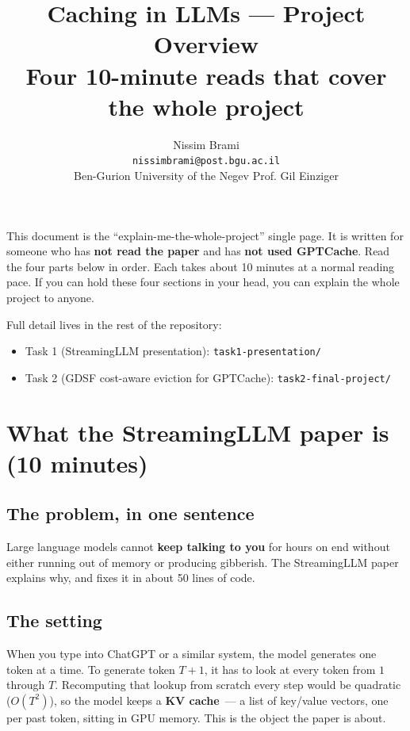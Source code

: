 \documentclass[11pt,a4paper]{article}
\title{
  \vspace{-1cm}
  {\color{navy}\Huge Caching in LLMs --- Project Overview}\\[0.3em]
  {\color{blue1}\Large Four 10-minute reads that cover the whole project}
}
\author{Nissim Brami \\[-0.2em]
  {\small \texttt{nissimbrami@post.bgu.ac.il}} \\[-0.2em]
  {\small Ben-Gurion University of the Negev \textbullet{} Prof. Gil Einziger}}
\date{}
\begin{document}
\maketitle
\thispagestyle{empty}

\noindent
This document is the ``explain-me-the-whole-project'' single page. It is
written for someone who has \textbf{not read the paper} and has \textbf{not
used GPTCache}. Read the four parts below in order. Each takes about 10
minutes at a normal reading pace. If you can hold these four sections in
your head, you can explain the whole project to anyone.

\medskip
Full detail lives in the rest of the repository:
\begin{itemize}[leftmargin=1.2em,itemsep=0.15em]
  \item Task 1 (StreamingLLM presentation): \texttt{task1-presentation/}
  \item Task 2 (GDSF cost-aware eviction for GPTCache): \texttt{task2-final-project/}
\end{itemize}

\section{What the StreamingLLM paper is (10 minutes)}

\subsection{The problem, in one sentence}
Large language models cannot \textbf{keep talking to you} for hours on end
without either running out of memory or producing gibberish. The
StreamingLLM paper explains why, and fixes it in about 50 lines of code.

\subsection{The setting}
When you type into ChatGPT or a similar system, the model generates one
token at a time. To generate token $T{+}1$, it has to look at every token
from $1$ through $T$. Recomputing that lookup from scratch every step would
be quadratic ($O(T^{2})$), so the model keeps a \textbf{KV cache}~--- a
list of key/value vectors, one per past token, sitting in GPU memory. This
is the object the paper is about.
\end{document}
